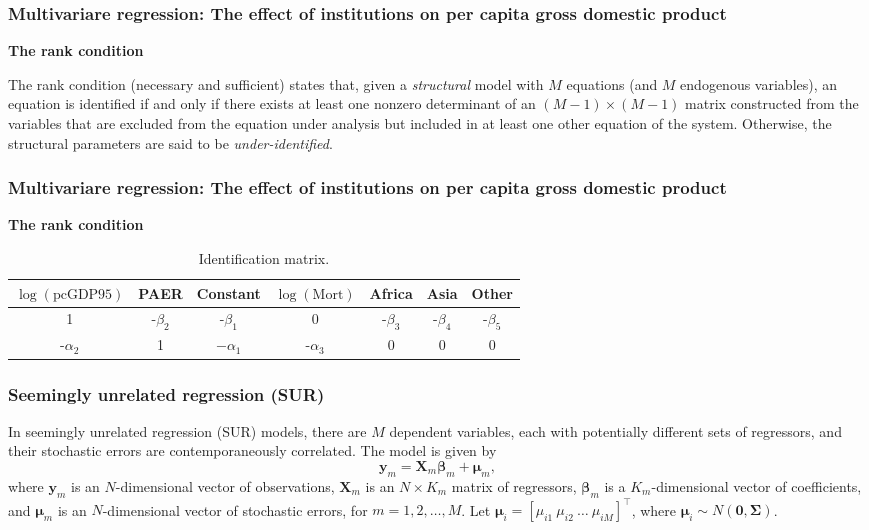 \documentclass[12pt, compress]{beamer}
\begin{document}
\begin{frame}
	\frametitle{Multivariare regression: The effect of institutions on per capita gross domestic product}
\textbf{The rank condition}

The rank condition (necessary and sufficient) states that, given a \textit{structural} model with $M$ equations (and $M$ endogenous variables), an equation is identified if and only if there exists at least one nonzero determinant of an $(M - 1) \times (M - 1)$ matrix constructed from the variables that are excluded from the equation under analysis but included in at least one other equation of the system. Otherwise, the structural parameters are said to be \textit{under-identified}.
\end{frame}

\begin{frame}
	\frametitle{Multivariare regression: The effect of institutions on per capita gross domestic product}
\textbf{The rank condition}

{\footnotesize{
\begin{table}[!h]
	\caption{Identification matrix.}\label{tab:71}%
	\begin{tabular}{ccccccc}
		$\log(\text{pcGDP95})$ & PAER & Constant & $\log(\text{Mort})$ & Africa & Asia & Other \\
		\hline
		1 & -$\beta_2$ & -$\beta_1$ & 0 & -$\beta_3$ & -$\beta_4$ & -$\beta_5$\\
		-$\alpha_2$ & 1 & $-\alpha_1$ & -$\alpha_3$ & 0 & 0 & 0 \\
        \hline
	\end{tabular}
\end{table}
}}
\end{frame}

\begin{frame}
	\frametitle{Seemingly unrelated regression (SUR)}
In seemingly unrelated regression (SUR) models, there are $M$ dependent variables, each with potentially different sets of regressors, and their stochastic errors are contemporaneously correlated. The model is given by
\[
\bm{y}_m = \bm{X}_m \bm{\beta}_m + \bm{\mu}_m,
\]
where $\bm{y}_m$ is an $N$-dimensional vector of observations, $\bm{X}_m$ is an $N \times K_m$ matrix of regressors, $\bm{\beta}_m$ is a $K_m$-dimensional vector of coefficients, and $\bm{\mu}_m$ is an $N$-dimensional vector of stochastic errors, for $m = 1, 2, \dots, M$. Let $\bm{\mu}_i = \left[\mu_{i1} \ \mu_{i2} \ \dots \ \mu_{iM}\right]^{\top}$, where $\bm{\mu}_i \sim {N}(\bm{0}, \bm{\Sigma})$.
\end{frame}
\end{document}
